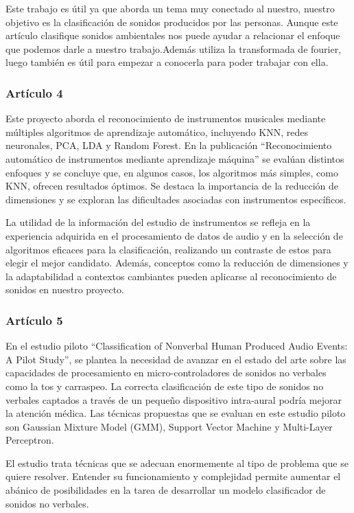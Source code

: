     Este trabajo es útil ya que aborda un tema muy conectado al nuestro, nuestro objetivo es la clasificación de sonidos producidos por las personas. Aunque este artículo clasifique sonidos ambientales nos puede ayudar a relacionar el enfoque que podemos darle a nuestro trabajo.Además utiliza la transformada de fourier, luego también es útil para empezar a conocerla para poder trabajar con ella.
\subsubsection*{Artículo 4}
    Este proyecto aborda el reconocimiento de instrumentos musicales mediante múltiples algoritmos de aprendizaje automático, incluyendo KNN, redes neuronales, PCA, LDA y Random Forest. En la publicación “Reconocimiento automático de instrumentos mediante aprendizaje máquina”\cite{salgado2019reconocimiento} se evalúan distintos enfoques y se concluye que, en algunos casos, los algoritmos más simples, como KNN, ofrecen resultados óptimos. Se destaca la importancia de la reducción de dimensiones y se exploran las dificultades asociadas con instrumentos específicos.

    La utilidad de la información del estudio de instrumentos se refleja en la experiencia adquirida en el procesamiento de datos de audio y en la selección de algoritmos eficaces para la clasificación, realizando un contraste de estos para elegir el mejor candidato. Además, conceptos como la reducción de dimensiones y la adaptabilidad a contextos cambiantes pueden aplicarse al reconocimiento de sonidos en nuestro proyecto.
\subsubsection*{Artículo 5}
    En el estudio piloto “Classification of Nonverbal Human Produced Audio Events: A Pilot Study”\cite{bouserhal2018classification}, se plantea la necesidad de avanzar en el estado del arte sobre las capacidades de procesamiento en micro-controladores de sonidos no verbales como la tos y carraspeo. La correcta clasificación de este tipo de sonidos no verbales captados a través de un pequeño dispositivo intra-aural podría mejorar la atención médica. Las técnicas propuestas que se evaluan en este estudio piloto son Gaussian Mixture Model (GMM), Support Vector Machine y Multi-Layer Perceptron.

    El estudio trata técnicas que se adecuan enormemente al tipo de problema que se quiere resolver. Entender su funcionamiento y complejidad permite aumentar el abánico de posibilidades en la tarea de desarrollar un modelo clasificador de sonidos no verbales.

